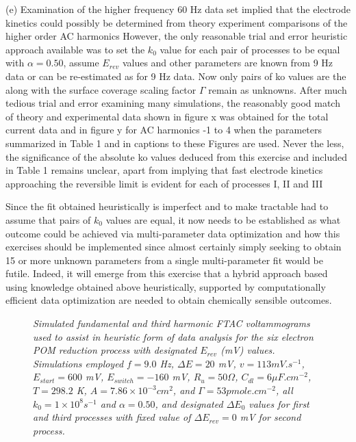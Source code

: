 \documentclass[a4paper, 12pt]{article}
\begin{document}
(e) Examination of the higher frequency 60 Hz data set implied that the 
electrode kinetics could possibly be determined from theory experiment 
comparisons of the higher order AC harmonics However, the only reasonable trial 
and error heuristic approach available was to set the $k_0$ value for each pair 
of processes to be equal with $\alpha = 0.50$, assume $E_{rev}$ values and other 
parameters are known from 9 Hz data or can be re-estimated as for 9 Hz data. Now 
only  pairs of ko values are the along with the surface coverage scaling factor 
$\Gamma$ remain as unknowns. After much tedious trial and error examining many 
simulations, the reasonably good match of theory and experimental data shown in 
figure x was obtained for the total current data and in figure y for AC 
harmonics -1 to 4 when the parameters summarized in Table 1 and in captions to 
these Figures are used.  Never the less, the significance of the absolute ko 
values deduced from this exercise and included in Table 1 remains unclear, apart 
from implying  that fast electrode kinetics  approaching the reversible limit is 
evident for each of processes I, II and III

Since the fit obtained heuristically is imperfect and to make tractable had to 
assume that pairs of $k_0$ values are equal, it now needs to be established as what 
outcome could be achieved   via multi-parameter data optimization and how this 
exercises should be implemented since almost certainly simply seeking to obtain 
15 or more unknown parameters from a single multi-parameter fit would be futile.  
Indeed, it will emerge from this exercise that a hybrid approach based using 
knowledge obtained above heuristically, supported by computationally efficient 
data optimization are needed to obtain chemically sensible outcomes.

\begin{figure}[h]
    \caption{\it{Simulated fundamental and third harmonic FTAC voltammograms 
    used to assist in heuristic form of data analysis for the six electron POM 
    reduction process with designated $E_{rev}$ (mV) values. Simulations 
    employed $f = 9.0$ Hz, $\Delta E = 20$ mV, $v = 113 mV.s^{-1}$, $E_{start} = 
    600$ mV, $E_{switch} = -160$ mV, $R_u = 50 \Omega$, $C_{dl} = 6 \mu 
    F.cm^{-2}$, $T = 298.2$ K, $A = 7.86 \times 10^{-3} cm^2$, and $\Gamma = 53 
    pmole.cm^{-2}$, all $k_0 = 1 \times 10^8 s^{-1}$ and $\alpha =0.50$, and 
    designated $\Delta E_0$ values for first and third processes with fixed 
    value of  $\Delta E_{rev} = 0$ mV for second process.}}
    \label{fig:sim_for_heuristic_E}
\end{figure}
\end{document}
